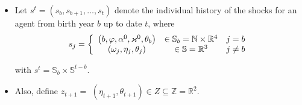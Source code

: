 \documentclass[notes=show]{beamer}
\begin{document}
\begin{frame}%



\begin{itemize}
\item Let $s^{t}=\left( s_{b},s_{b+1},\ldots ,s_{t}\right) $ denote the
individual history of the shocks for an agent from birth year $b$ up to date 
$t$, where%
\begin{equation}
s_{j}=\left\{ 
\begin{array}{ccc}
\left( b,\varphi ,\alpha ^{0},\varkappa ^{0},\theta _{b}\right) & \in {%
\mathbb{S}}_b=%
\mathbb{N}
\times 
\mathbb{R}
^{4} & j=b \\ 
\left( \omega _{j},\eta _{j},\theta _{j}\right) & \in \mathbb{S}=%
\mathbb{R}
^{3} & j\neq b%
\end{array}%
\right.
\end{equation}

with $s^{t}={\mathbb{S}}_{b}\times \mathbb{S}^{t-b}$.

\item Also, define $z_{t+1}=$ $\left( \eta _{t+1},\theta _{t+1}\right) \in
Z\subseteq 
\mathbb{Z}
=%
\mathbb{R}
^{2}$.
\end{itemize}

\transboxout%
\end{frame}%

\bigskip
\end{document}
